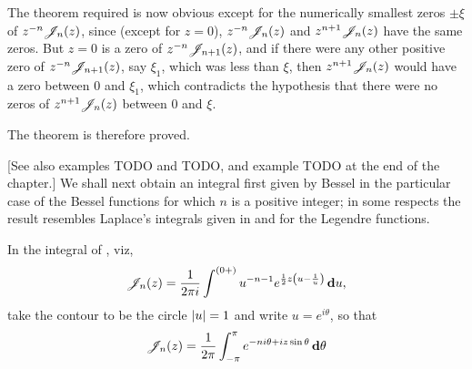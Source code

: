 The theorem required is now obvious except for the numerically
smallest zeros $\pm \xi$ of $z^{-n}\mathscr{J}_{n}(z)$, since (except for $z=0$),
$z^{-n}\mathscr{J}_{n}(z)$ and $z^{n+1}\mathscr{J}_{n}(z)$ have the same zeros. But $z=0$ is a
zero of $z^{-n}\mathscr{J}_{n+1}(z)$, and if there were any other positive zero
of $z^{-n}\mathscr{J}_{n+1}(z)$, say $\xi_{1}$, which was less than $\xi$, then
$z^{n+1}\mathscr{J}_{n}(z)$ would have a zero between $0$ and $\xi_{1}$, which
contradicts the hypothesis that there were no zeros of
$z^{n+1}\mathscr{J}_{n}(z)$ between $0$ and $\xi$.

The theorem is therefore proved.

[See also  examples TODO and TODO, and example
TODO at the end of the chapter.]
%
%
We shall next obtain an integral first given by Bessel in the
particular case of the Bessel functions for which $n$ is a positive
integer; in some respects the result resembles Laplace's integrals
given in  and 
for the Legendre functions.

In the integral of , viz,
$$
\mathscr{J}_{n}(z)
=
\frac{1}{2\pi i}
\int^{(0+)}
u^{-n-1}
e^{\frac{1}{2} z \left(  u - \frac{1}{u}  \right)}
\, \mathbf{d} u,
$$
take the contour to be the circle $\left| u \right| = 1$ and write
$u = e^{i\theta}$, so that
$$
\mathscr{J}_{n}(z)
=
\frac{1}{2\pi}
\int_{-\pi}^{\pi}
e^{-ni\theta + iz\sin\theta}
\, \mathbf{d} \theta
$$

